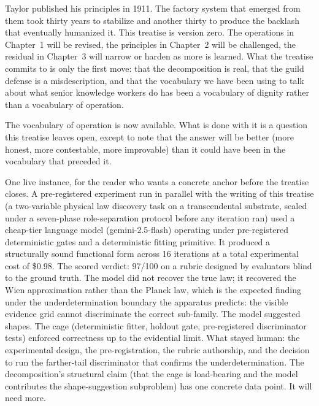 \documentclass[11pt]{article}
\begin{document}
Taylor published his principles in 1911. The factory system that emerged from them took thirty years to stabilize and another thirty to produce the backlash that eventually humanized it. This treatise is version zero. The operations in Chapter~1 will be revised, the principles in Chapter~2 will be challenged, the residual in Chapter~3 will narrow or harden as more is learned. What the treatise commits to is only the first move: that the decomposition is real, that the guild defense is a misdescription, and that the vocabulary we have been using to talk about what senior knowledge workers do has been a vocabulary of dignity rather than a vocabulary of operation.

The vocabulary of operation is now available. What is done with it is a question this treatise leaves open, except to note that the answer will be better (more honest, more contestable, more improvable) than it could have been in the vocabulary that preceded it.

One live instance, for the reader who wants a concrete anchor before the treatise closes. A pre-registered experiment run in parallel with the writing of this treatise (a two-variable physical law discovery task on a transcendental substrate, sealed under a seven-phase role-separation protocol before any iteration ran) used a cheap-tier language model (gemini-2.5-flash) operating under pre-registered deterministic gates and a deterministic fitting primitive. It produced a structurally sound functional form across 16 iterations at a total experimental cost of \$0.98. The scored verdict: 97/100 on a rubric designed by evaluators blind to the ground truth. The model did not recover the true law; it recovered the Wien approximation rather than the Planck law, which is the expected finding under the underdetermination boundary the apparatus predicts: the visible evidence grid cannot discriminate the correct sub-family. The model suggested shapes. The cage (deterministic fitter, holdout gate, pre-registered discriminator tests) enforced correctness up to the evidential limit. What stayed human: the experimental design, the pre-registration, the rubric authorship, and the decision to run the farther-tail discriminator that confirms the underdetermination. The decomposition's structural claim (that the cage is load-bearing and the model contributes the shape-suggestion subproblem) has one concrete data point. It will need more.
\end{document}
